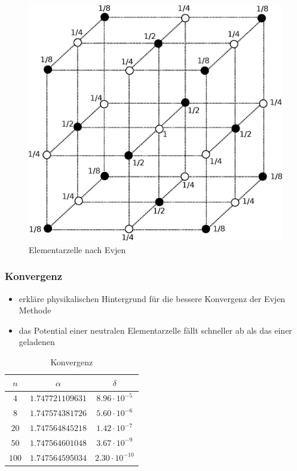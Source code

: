 \documentclass[10pt,a4paper]{article}
\begin{document}
\begin{figure}[h]
	\centering
	\includegraphics[scale = 0.4]{./figures/wuerfel.eps}
	\caption{Elementarzelle nach Evjen}
	\label{skalierungsgrafik3d}
\end{figure}
	

\subsubsection{Konvergenz}

\begin{itemize}
\item erkläre physikalischen Hintergrund für die bessere Konvergenz der Evjen
Methode
\item das Potential einer neutralen Elementarzelle fällt schneller ab als das
einer geladenen
\end{itemize}

\begin{table}[h]
\centering
\begin{tabular}{c|c|c}
\rule[-1ex]{0pt}{2.5ex} $n$ & $\alpha$ & $\delta$ \\ 
\hline 
\rule[-1ex]{0pt}{2.5ex} $4$ & $1.747721109631$ & $8.96\cdot10^{-5}$ \\ 
\hline 
\rule[-1ex]{0pt}{2.5ex} $8$ & $1.747574381726$ & $5.60\cdot10^{-6}$ \\ 
\hline 
\rule[-1ex]{0pt}{2.5ex} $20$ & $1.747564845218$ & $1.42\cdot10^{-7}$ \\ 
\hline 
\rule[-1ex]{0pt}{2.5ex} $50$ & $1.747564601048$ & $3.67\cdot10^{-9}$ \\ 
\hline 
\rule[-1ex]{0pt}{2.5ex} $100$ & $1.747564595034$ & $2.30\cdot10^{-10}$ \\ 
\end{tabular} 
\caption{Konvergenz}
\end{table}
\end{document}
